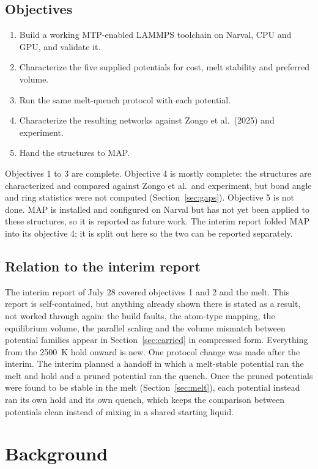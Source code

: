 \documentclass[11pt]{article}
\begin{document}
\subsection{Objectives}
\begin{enumerate}[nosep]
    \item Build a working MTP-enabled LAMMPS toolchain on Narval, CPU and GPU, and validate it.
    \item Characterize the five supplied potentials for cost, melt stability and preferred volume.
    \item Run the same melt-quench protocol with each potential.
    \item Characterize the resulting networks against Zongo et al.\ (2025) and experiment.
    \item Hand the structures to MAP.
\end{enumerate}
Objectives 1 to 3 are complete. Objective 4 is mostly complete: the structures are characterized and compared against Zongo et al.\ and experiment, but bond angle and ring statistics were not computed (Section~\ref{sec:gaps}). Objective 5 is not done. MAP is installed and configured on Narval but has not yet been applied to these structures, so it is reported as future work. The interim report folded MAP into its objective 4; it is split out here so the two can be reported separately.

\subsection{Relation to the interim report}
The interim report of July 28 covered objectives 1 and 2 and the melt. This report is self-contained, but anything already shown there is stated as a result, not worked through again: the build faults, the atom-type mapping, the equilibrium volume, the parallel scaling and the volume mismatch between potential families appear in Section~\ref{sec:carried} in compressed form. Everything from the 2500~K hold onward is new. One protocol change was made after the interim. The interim planned a handoff in which a melt-stable potential ran the melt and hold and a pruned potential ran the quench. Once the pruned potentials were found to be stable in the melt (Section~\ref{sec:melt}), each potential instead ran its own hold and its own quench, which keeps the comparison between potentials clean instead of mixing in a shared starting liquid.

\section{Background}
\end{document}
